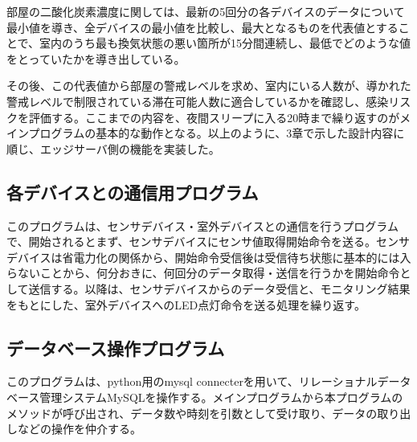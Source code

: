部屋の二酸化炭素濃度に関しては、最新の5回分の各デバイスのデータについて最小値を導き、全デバイスの最小値を比較し、最大となるものを代表値とすることで、室内のうち最も換気状態の悪い箇所が15分間連続し、最低でどのような値をとっていたかを導き出している。

その後、この代表値から部屋の警戒レベルを求め、室内にいる人数が、導かれた警戒レベルで制限されている滞在可能人数に適合しているかを確認し、感染リスクを評価する。ここまでの内容を、夜間スリープに入る20時まで繰り返すのがメインプログラムの基本的な動作となる。以上のように、3章で示した設計内容に順じ、エッジサーバ側の機能を実装した。

\subsection*{各デバイスとの通信用プログラム}
このプログラムは、センサデバイス・室外デバイスとの通信を行うプログラムで、開始されるとまず、センサデバイスにセンサ値取得開始命令を送る。センサデバイスは省電力化の関係から、開始命令受信後は受信待ち状態に基本的には入らないことから、何分おきに、何回分のデータ取得・送信を行うかを開始命令として送信する。以降は、センサデバイスからのデータ受信と、モニタリング結果をもとにした、室外デバイスへのLED点灯命令を送る処理を繰り返す。

\subsection*{データベース操作プログラム}
このプログラムは、python用のmysql connecterを用いて、リレーショナルデータベース管理システムMySQLを操作する。メインプログラムから本プログラムのメソッドが呼び出され、データ数や時刻を引数として受け取り、データの取り出しなどの操作を仲介する。

